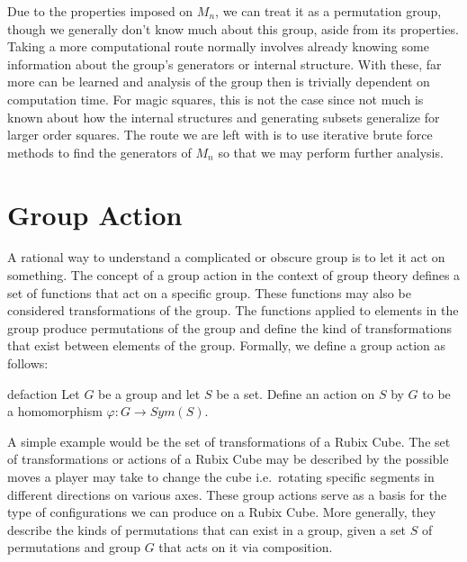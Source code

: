 \documentclass[12pt]{report}
\begin{document}
\par Due to the properties imposed on $M_n$, we can treat it as a permutation group, though we
generally don't know much about this group, aside from its properties. Taking a more computational
route normally involves already knowing some information about the group's generators or internal
structure. With these, far more can be learned and analysis of the group then is trivially
dependent on computation time. For magic squares, this is not the case since not much is known
about how the internal structures and generating subsets generalize for larger order squares. The
route we are left with is to use iterative brute force methods to find the generators of $M_n$ so
that we may perform further analysis.

\section{Group Action}

\par A rational way to understand a complicated or obscure group is to let it act on something. The
concept of a group action in the context of group theory defines a set of functions that act on a
specific group. These functions may also be considered transformations of the group. The functions
applied to elements in the group produce permutations of the group and define the kind of
transformations that exist between elements of the group. Formally, we define a group action as
follows\cite{Deskins}:

\singlespacing{}
\begin{defbox}{}{defaction}
  Let $G$ be a group and let $S$ be a set. Define an action on $S$ by $G$ to be a homomorphism
  $\varphi:G\rightarrow Sym\left(S\right)$.
\end{defbox}
\doublespacing{}

A simple example would be the set of transformations of a Rubix Cube. The set of transformations or
actions of a Rubix Cube may be described by the possible moves a player may take to change the cube
i.e.\ rotating specific segments in different directions on various axes. These group actions serve
as a basis for the type of configurations we can produce on a Rubix Cube. More generally, they
describe the kinds of permutations that can exist in a group, given a set $S$ of permutations and
group $G$ that acts on it via composition.
\end{document}

